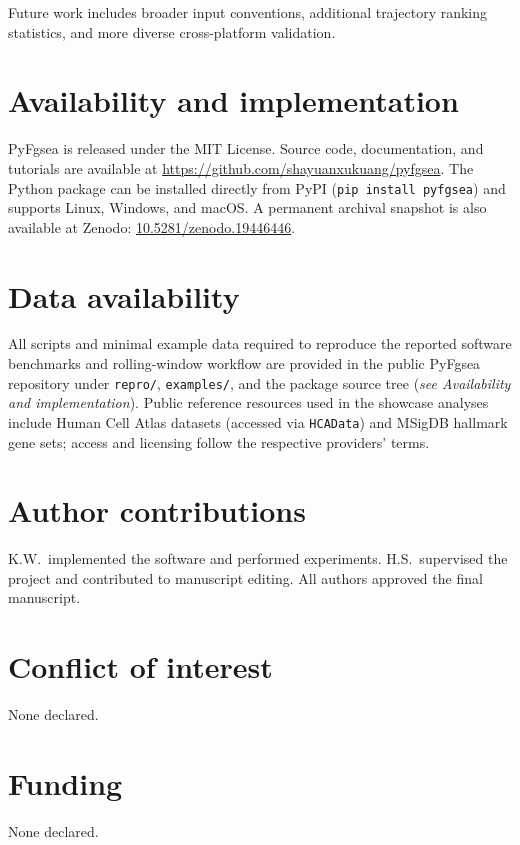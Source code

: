 \documentclass[numsec,webpdf,modern,large,numbered]{oup-authoring-template}
\newcommand{\rev}[1]{\textcolor{revisionred}{#1}}
\begin{document}
Future work includes broader input conventions, additional trajectory ranking statistics, and more diverse cross-platform validation.

\section*{Availability and implementation}
PyFgsea is released under the MIT License. Source code, documentation, and tutorials are available at \href{https://github.com/shayuanxukuang/pyfgsea}{https://github.com/shayuanxukuang/pyfgsea}. The Python package can be installed directly from PyPI (\texttt{pip install pyfgsea}) and supports Linux, Windows, and macOS. \rev{A permanent archival snapshot is also available at Zenodo: \href{https://doi.org/10.5281/zenodo.19446446}{10.5281/zenodo.19446446}.}


\section*{Data availability}
\rev{All scripts and minimal example data required to reproduce the reported software benchmarks and rolling-window workflow are provided in the public PyFgsea repository under \texttt{repro/}, \texttt{examples/}, and the package source tree (\textit{see Availability and implementation}).}
Public reference resources used in the showcase analyses include Human Cell Atlas datasets (accessed via \texttt{HCAData}) and MSigDB hallmark gene sets; access and licensing follow the respective \rev{providers' terms}.


\section*{Author contributions}
K.W.\ implemented the software and performed experiments. H.S.\ supervised the project and contributed to manuscript editing. All authors approved the final manuscript.

\section*{Conflict of interest}
None declared.

\section*{Funding}
None declared.



\end{document}
